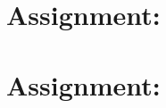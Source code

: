 \documentclass[a4paper,12pt,oneside]{scrreprt}
\begin{document}
	
	
   
	\section{Assignment:}
		
	
    
	\section{Assignment:}
		\subsection{} %
		
			\subsubsection{}
				
			
			\subsubsection{}
				
			
		\subsection{} %
			
\end{document}
